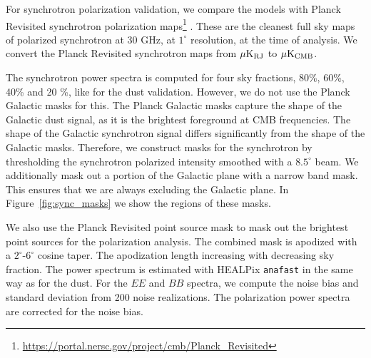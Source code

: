 \documentclass[twocolumn]{aastex631}
\newcommand{\giuse}[1]{\textcolor{orange}{(GP: #1)}}
\begin{document}

For synchrotron polarization validation, we compare the models with Planck Revisited synchrotron polarization maps\footnote{\url{https://portal.nersc.gov/project/cmb/Planck\_Revisited}} \citep{Delabrouille2024}. These are the cleanest full sky maps of polarized synchrotron at 30 GHz, at $1^\circ$ resolution, at the time of analysis. We convert the Planck Revisited synchrotron maps from $\mu {\rm K_{RJ}}$ to $\mu {\rm K_{CMB}}$. 

The synchrotron power spectra is computed for four sky fractions, 80\%, 60\%, 40\% and 20 \%, like for the dust validation. However, we do not use the Planck Galactic masks for this. The Planck Galactic masks capture the shape of the Galactic dust signal, as it is the brightest foreground at CMB frequencies. The shape of the Galactic synchrotron signal differs significantly from the shape of the Galactic masks. Therefore, we construct masks for the synchrotron by thresholding the synchrotron polarized intensity smoothed with a $8.5^\circ$ beam. We additionally mask out a portion of the Galactic plane with a narrow band mask. This ensures that we are always excluding the Galactic plane. In Figure~\ref{fig:sync_masks} we show the regions of these masks. 

We also use the Planck Revisited point source mask to mask out the brightest point sources for the polarization analysis. The combined mask is apodized with a $2^\circ$-$6^\circ$ cosine taper. The apodization length increasing with decreasing sky fraction. The power spectrum is estimated with HEALPix \texttt{anafast} in the same way as for the dust. For the $EE$ and $BB$ spectra, we compute the noise bias and standard deviation from 200 noise realizations. The polarization power spectra are corrected for the noise bias. 
\end{document}
